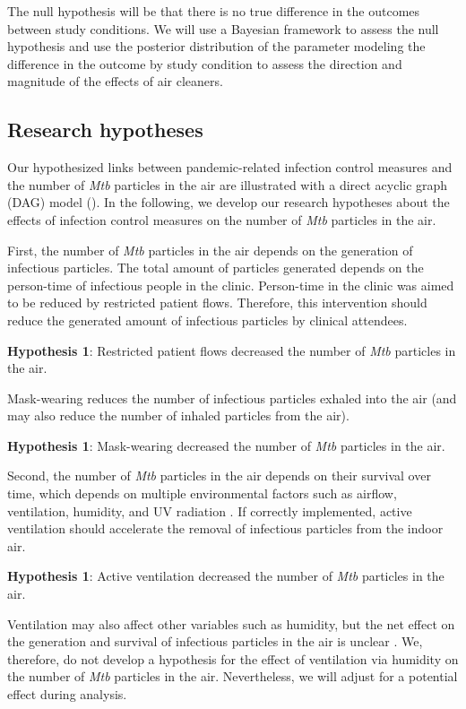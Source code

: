 \documentclass{article}
\newcommand{\forceindent}{\leavevmode{\parindent=1em\indent}}
\begin{document}
The null hypothesis will be that there is no true difference in the outcomes between study conditions. We will use a Bayesian framework to assess the null hypothesis and use the posterior distribution of the parameter modeling the difference in the outcome by study condition to assess the direction and magnitude of the effects of air cleaners. 

\subsection{Research hypotheses}

Our hypothesized links between pandemic-related infection control measures and the number of \emph{Mtb} particles in the air are illustrated with a direct acyclic graph (DAG) model (). In the following, we develop our research hypotheses about the effects of infection control measures on the number of \emph{Mtb} particles in the air. 

First, the number of \emph{Mtb} particles in the air depends on the generation of infectious particles. The total amount of particles generated depends on the person-time of infectious people in the clinic. Person-time in the clinic was aimed to be reduced by restricted patient flows. Therefore, this intervention should reduce the generated amount of infectious particles by clinical attendees. \medskip

\forceindent \textbf{Hypothesis 1}: Restricted patient flows decreased the number of \emph{Mtb} particles in the air. \medskip


Mask-wearing reduces the number of infectious particles exhaled into the air (and may also reduce the number of inhaled particles from the air). \medskip

\forceindent \textbf{Hypothesis 1}: Mask-wearing decreased the number of \emph{Mtb} particles in the air. \medskip

Second, the number of \emph{Mtb} particles in the air depends on their survival over time, which depends on multiple environmental factors such as airflow, ventilation, humidity, and UV radiation \cite{Wang2021Science}. If correctly implemented, active ventilation should accelerate the removal of infectious particles from the indoor air. \medskip

\forceindent \textbf{Hypothesis 1}: Active ventilation decreased the number of \emph{Mtb} particles in the air. \medskip

Ventilation may also affect other variables such as humidity, but the net effect on the generation and survival of infectious particles in the air is unclear \cite{Wang2021Science}. We, therefore, do not develop a hypothesis for the effect of ventilation via humidity on the number of \emph{Mtb} particles in the air. Nevertheless, we will adjust for a potential effect during analysis.
\end{document}
